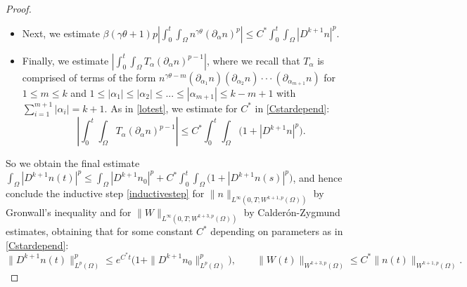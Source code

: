 \documentclass[10pt,a4paper]{amsart}
\begin{document}
\begin{proof}
\begin{itemize}
\begin{equation*}
\end{equation*}
\item Next, we estimate $\displaystyle \beta (\gamma \theta + 1) p \left|\int_{0}^{t}  \int_{\Omega} n^{\gamma \theta} (\partial_{\alpha}n)^{p}\right| \le C^{*} \int_{0}^{t} \int_{\Omega} |D^{k + 1}n|^{p}$.
\item Finally, we estimate $\displaystyle \left|\int_{0}^{t} \int_{\Omega} T_{\alpha} (\partial_{\alpha}n)^{p - 1}\right|$, where we recall that $T_{\alpha}$ is comprised of terms of the form $n^{\gamma \theta - m}(\partial_{\alpha_{1}}n)(\partial_{\alpha_{2}}n) \cdot \cdot \cdot (\partial_{\alpha_{m + 1}}n)$ for $1 \le m \le k$ and $1 \le |\alpha_{1}| \le |\alpha_{2}| \le ... \le |\alpha_{m + 1}| \le k - m + 1$ with $\displaystyle \sum_{i = 1}^{m + 1} |\alpha_{i}| = k + 1$. As in \eqref{lotest}, we estimate for $C^{*}$ in \eqref{Cstardepend}:
\begin{equation*}
\left|\int_{0}^{t} \int_{\Omega} T_{\alpha}(\partial_{\alpha}n)^{p - 1}\right| \le C^{*}\int_{0}^{t} \int_{\Omega} \Big(1 + |D^{k + 1}n|^{p}\Big).
\end{equation*}
\end{itemize}

So we obtain the final estimate $\displaystyle 
\int_{\Omega} |D^{k + 1}n(t)|^{p} \le \int_{\Omega} |D^{k + 1}n_{0}|^{p} + C^{*} \int_{0}^{t} \int_{\Omega} \Big(1 + |D^{k + 1}n(s)|^{p}\Big)$, and hence conclude the inductive step \eqref{inductivestep} for $\|n\|_{L^{\infty}(0, T; W^{k + 1, p}(\Omega))}$ by Gronwall's inequality and for $\|W\|_{L^{\infty}(0, T; W^{k + 3, p}(\Omega))}$ by Calder\'{o}n-Zygmund estimates, obtaining that for some constant $C^{*}$ depending on parameters as in \eqref{Cstardepend}:
\begin{equation*}
\|D^{k + 1}n(t)\|_{L^{p}(\Omega)}^{p} \le e^{C^{*}t}\Big(1 + \|D^{k + 1} n_{0}\|_{L^{p}(\Omega)}^{p}\Big), \qquad \|W(t)\|_{W^{k + 3, p}(\Omega)} \le C^{*}\|n(t)\|_{W^{k + 1, p}(\Omega)}.
\end{equation*}

\end{proof}
\end{document}
